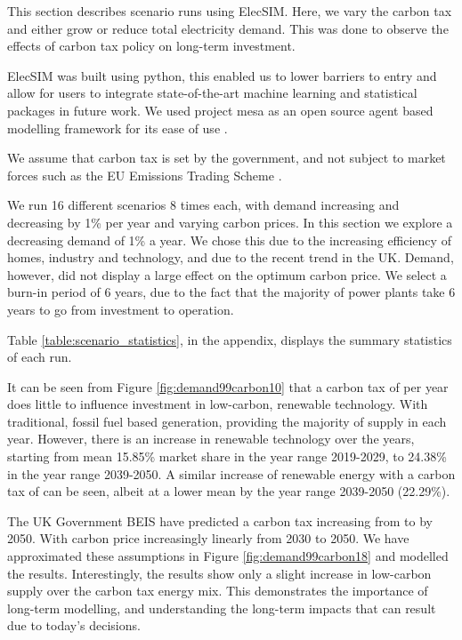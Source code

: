 
This section describes scenario runs using ElecSIM. Here, we vary the carbon tax and either grow or reduce total electricity demand. This was done to observe the effects of carbon tax policy on long-term investment.

ElecSIM was built using python, this enabled us to lower barriers to entry and allow for users to integrate state-of-the-art machine learning and statistical packages in future work. We used project mesa as an open source agent based modelling framework for its ease of use \cite{Masad2015}.

{\color{blue}
We assume that carbon tax is set by the government, and not subject to market forces such as the EU Emissions Trading Scheme \cite{Council2016}.

We run 16 different scenarios 8 times each, with demand increasing and decreasing by 1\% per year and  varying carbon prices. In this section we explore a decreasing demand of 1\% a year. We chose this due to the increasing efficiency of homes, industry and technology, and due to the recent trend in the UK. Demand, however, did not display a large effect on the optimum carbon price. We select a burn-in period of 6 years, due to the fact that the majority of power plants take 6 years to go from investment to operation.

Table \ref{table:scenario_statistics}, in the appendix, displays the summary statistics of each run.

It can be seen from Figure \ref{fig:demand99carbon10} that a carbon tax of  per year does little to influence investment in low-carbon, renewable technology. With traditional, fossil fuel based generation, providing the majority of supply in each year. However, there is an increase in renewable technology over the years, starting from mean 15.85\% market share in the year range 2019-2029, to 24.38\% in the year range 2039-2050. A similar increase of renewable energy with a carbon tax of  can be seen, albeit at a lower mean by the year range 2039-2050 (22.29\%).
}

The UK Government BEIS have predicted a carbon tax increasing from  to  by 2050. With carbon price increasingly linearly from 2030 to 2050. We have approximated these assumptions in Figure \ref{fig:demand99carbon18} and modelled the results. Interestingly, the results show only a slight increase in low-carbon supply over the  carbon tax energy mix. This demonstrates the importance of long-term modelling, and understanding the long-term impacts that can result due to today's decisions.

